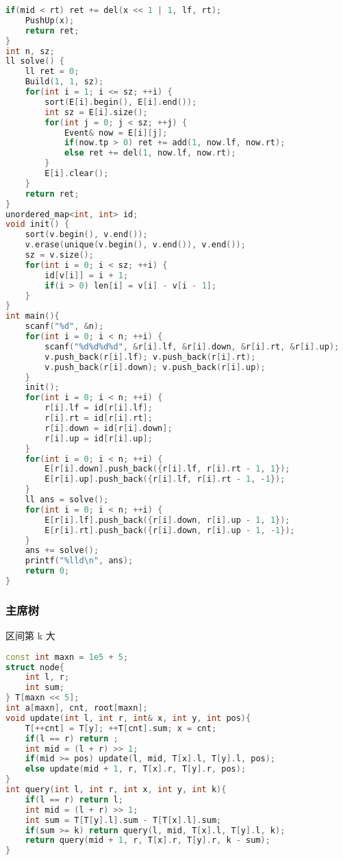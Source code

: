 \begin{lstlisting}[language=C++]
    if(mid < rt) ret += del(x << 1 | 1, lf, rt);
    PushUp(x);
    return ret;
}
int n, sz;
ll solve() {
    ll ret = 0;
    Build(1, 1, sz);
    for(int i = 1; i <= sz; ++i) {
        sort(E[i].begin(), E[i].end());
        int sz = E[i].size();
        for(int j = 0; j < sz; ++j) {
            Event& now = E[i][j];
            if(now.tp > 0) ret += add(1, now.lf, now.rt);
            else ret += del(1, now.lf, now.rt);
        }
        E[i].clear();
    }
    return ret;
}
unordered_map<int, int> id;
void init() {
    sort(v.begin(), v.end());
    v.erase(unique(v.begin(), v.end()), v.end());
    sz = v.size();
    for(int i = 0; i < sz; ++i) {
        id[v[i]] = i + 1;
        if(i > 0) len[i] = v[i] - v[i - 1];
    }
}
int main(){
    scanf("%d", &n);
    for(int i = 0; i < n; ++i) {
        scanf("%d%d%d%d", &r[i].lf, &r[i].down, &r[i].rt, &r[i].up);
        v.push_back(r[i].lf); v.push_back(r[i].rt);
        v.push_back(r[i].down); v.push_back(r[i].up);
    }
    init();
    for(int i = 0; i < n; ++i) {
        r[i].lf = id[r[i].lf];
        r[i].rt = id[r[i].rt];
        r[i].down = id[r[i].down];
        r[i].up = id[r[i].up];
    }
    for(int i = 0; i < n; ++i) {
        E[r[i].down].push_back({r[i].lf, r[i].rt - 1, 1});
        E[r[i].up].push_back({r[i].lf, r[i].rt - 1, -1});
    }
    ll ans = solve();
    for(int i = 0; i < n; ++i) {
        E[r[i].lf].push_back({r[i].down, r[i].up - 1, 1});
        E[r[i].rt].push_back({r[i].down, r[i].up - 1, -1});
    }
    ans += solve();
    printf("%lld\n", ans);
    return 0;
}
\end{lstlisting}

\subsubsection{主席树}

区间第 k 大

\begin{lstlisting}[language=C++]
const int maxn = 1e5 + 5;
struct node{
    int l, r;
    int sum;
} T[maxn << 5];
int a[maxn], cnt, root[maxn];
void update(int l, int r, int& x, int y, int pos){
    T[++cnt] = T[y]; ++T[cnt].sum; x = cnt;
    if(l == r) return ;
    int mid = (l + r) >> 1;
    if(mid >= pos) update(l, mid, T[x].l, T[y].l, pos);
    else update(mid + 1, r, T[x].r, T[y].r, pos);
}
int query(int l, int r, int x, int y, int k){
    if(l == r) return l;
    int mid = (l + r) >> 1;
    int sum = T[T[y].l].sum - T[T[x].l].sum;
    if(sum >= k) return query(l, mid, T[x].l, T[y].l, k);
    return query(mid + 1, r, T[x].r, T[y].r, k - sum);
}
\end{lstlisting}

